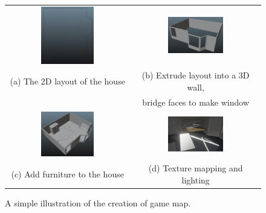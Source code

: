 \documentclass[12pt, a4paper, oneside]{article}
\begin{document}
    \begin{figure}[H]
        \begin{tabular}{cc}
            \includegraphics[width=0.45\textwidth]{house_model1.png} & \includegraphics[width=0.45\textwidth]{house_model2.png} \\
            (a) The 2D layout of the house & (b) Extrude layout into a 3D wall, \\
            {} & bridge faces to make window \\
            \includegraphics[width=0.45\textwidth]{house_model3.png} & \includegraphics[width=0.45\textwidth]{house_model4.png} \\
            (c) Add furniture to the house & (d) Texture mapping and lighting
        \end{tabular}
        \caption{A simple illustration of the creation of game map.}
    \end{figure}
\end{document}
